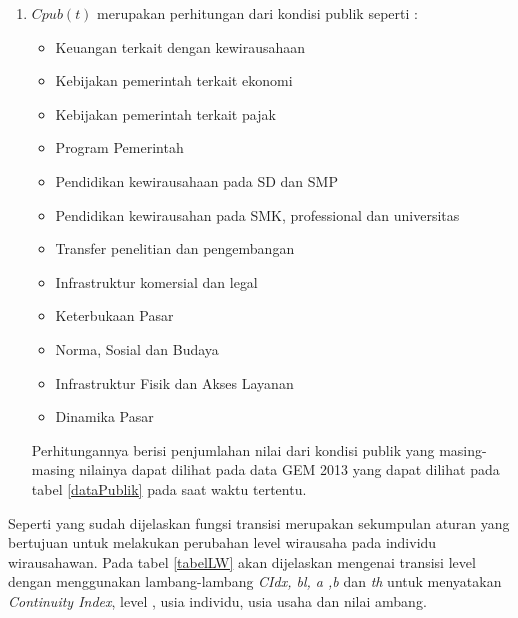 \begin{enumerate}
		\item $Cpub(t)$ merupakan perhitungan dari kondisi publik seperti :
		\begin{itemize}
			\item Keuangan terkait dengan kewirausahaan
			\item Kebijakan pemerintah terkait ekonomi
			\item Kebijakan pemerintah terkait pajak
			\item Program Pemerintah
			\item Pendidikan kewirausahaan pada SD dan SMP
			\item Pendidikan kewirausahan pada SMK, professional dan universitas
			\item Transfer penelitian dan pengembangan
			\item Infrastruktur komersial dan legal
			\item Keterbukaan Pasar
			\item Norma, Sosial dan Budaya
			\item Infrastruktur Fisik dan Akses Layanan
			\item Dinamika Pasar
		\end{itemize}
		Perhitungannya berisi penjumlahan nilai dari kondisi publik yang masing-masing nilainya dapat dilihat pada data GEM 2013 yang dapat dilihat pada tabel \ref{dataPublik} pada saat waktu tertentu.

\end{enumerate}    

Seperti yang sudah dijelaskan fungsi transisi merupakan sekumpulan aturan yang bertujuan untuk melakukan perubahan level wirausaha pada individu wirausahawan. Pada tabel \ref{tabelLW} akan dijelaskan mengenai transisi level dengan menggunakan lambang-lambang \textit{CIdx, bl, a ,b} dan \textit{th} untuk menyatakan \textit{Continuity Index}, level , usia individu, usia usaha dan nilai ambang.

